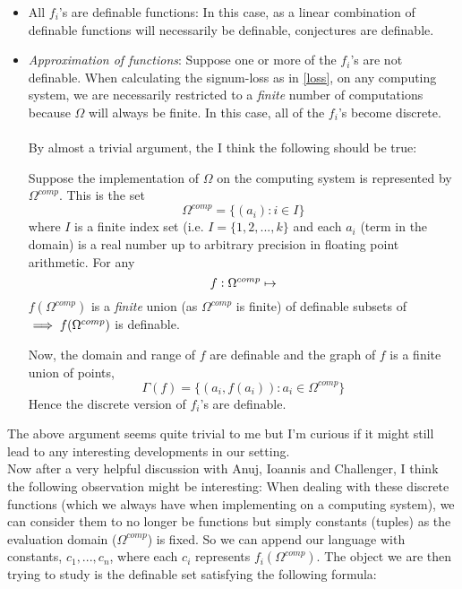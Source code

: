 \begin{itemize}
    \item All $f_i$'s are definable functions: In this case, as a linear combination of definable functions will necessarily be definable, conjectures are definable.
    \item \textit{Approximation of functions}: Suppose one or more of the $f_i$'s are not definable. When calculating the signum-loss as in \ref{loss}, on any computing system, we are necessarily restricted to a \textit{finite} number of computations because $\Omega$ will always be finite. In this case, all of the $f_i$'s become discrete.
    \\\\ By almost a trivial argument, the I think the following should be true:

    Suppose the implementation of $\Omega$ on the computing system is represented by $\Omega^{comp}$. This is the set
    \begin{equation*}
        \Omega^{comp} = \{(a_i) : i\in I\} 
    \end{equation*}
    where $I$ is a finite index set (i.e. $I = \{1, 2, ..., k\}$ and each $a_i$ (term in the domain) is a real number up to arbitrary precision in floating point arithmetic.
    For any
    \begin{equation*}
        f:\Omega^{comp}\mapsto\real
    \end{equation*}
    $f(\Omega^{comp})$ is a \textit{finite} union (as $\Omega^{comp}$ is finite) of definable subsets of $\real\implies f(\Omega^{comp})$ is definable.
    \par Now, the domain and range of $f$ are definable and the graph of $f$ is a finite union of points,
    \begin{equation*}
        \Gamma(f) = \{(a_i, f(a_i)): a_i\in\Omega^{comp}\}
    \end{equation*}
    Hence the discrete version of $f_i$'s are definable.
\end{itemize}

The above argument seems quite trivial to me but I'm curious if it might still lead to any interesting developments in our setting.\\
Now after a very helpful discussion with Anuj, Ioannis and Challenger, I think the following observation might be interesting:
When dealing with these discrete functions (which we always have when implementing on a computing system), we can consider them to no longer be functions but simply constants (tuples) as the evaluation domain ($\Omega^{comp}$) is fixed. So we can append our language with constants, $c_1,...,c_n$, where each $c_i$ represents $f_i(\Omega^{comp})$. The object we are then trying to study is the definable set satisfying the following formula:

